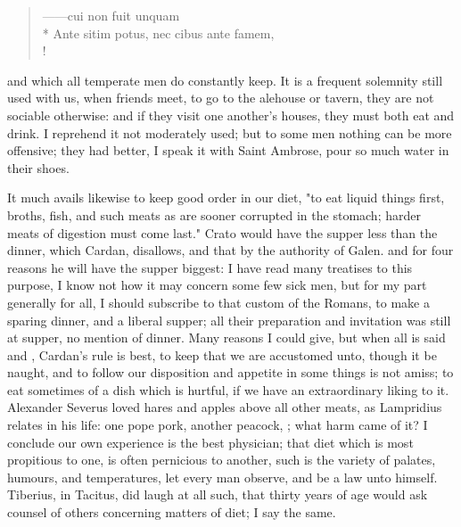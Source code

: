 {\begin{latin}
\begin{verse}%
------cui non fuit unquam\\*
Ante sitim potus, nec cibus ante famem,\\!
\end{verse}%
\end{latin}

and which all temperate men do constantly keep. It is a frequent solemnity still used with us, when friends meet, to go to the alehouse or tavern, they are not sociable otherwise: and if they visit one another's houses, they must both eat and drink. I reprehend it not moderately used; but to some men nothing can be more offensive; they had better, I speak it with Saint Ambrose, pour so much water in their shoes.

It much avails likewise to keep good order in our diet, "to eat liquid things first, broths, fish, and such meats as are sooner corrupted in the stomach; harder meats of digestion must come last." Crato would have the supper less than the dinner, which Cardan,  disallows, and that by the authority of Galen.  and for four reasons he will have the supper biggest: I have read many treatises to this purpose, I know not how it may concern some few sick men, but for my part generally for all, I should subscribe to that custom of the Romans, to make a sparing dinner, and a liberal supper; all their preparation and invitation was still at supper, no mention of dinner. Many reasons I could give, but when all is said  and , Cardan's rule is best, to keep that we are accustomed unto, though it be naught, and to follow our disposition and appetite in some things is not amiss; to eat sometimes of a dish which is hurtful, if we have an extraordinary liking to it. Alexander Severus loved hares and apples above all other meats, as Lampridius relates in his life: one pope pork, another peacock, \etc{}; what harm came of it? I conclude our own experience is the best physician; that diet which is most propitious to one, is often pernicious to another, such is the variety of palates, humours, and temperatures, let every man observe, and be a law unto himself. Tiberius, in Tacitus, did laugh at all such, that thirty years of age would ask counsel of others concerning matters of diet; I say the same.

}
